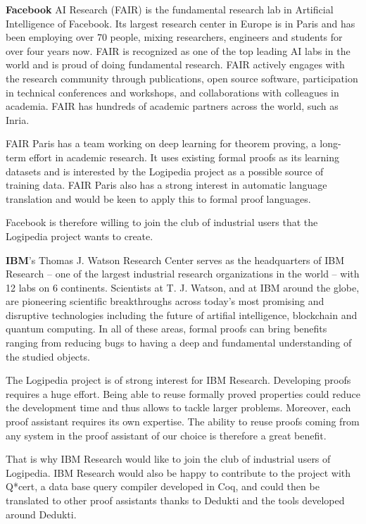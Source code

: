 {{\bf Facebook} AI Research (FAIR) is the fundamental research lab in
Artificial Intelligence of Facebook. Its largest research center in
Europe is in Paris and has been employing over 70 people, mixing
researchers, engineers and students for over four years now. FAIR is
recognized as one of the top leading AI labs in the world and is proud
of doing fundamental research. FAIR actively engages with the research
community through publications, open source software, participation in
technical conferences and workshops, and collaborations with
colleagues in academia. FAIR has hundreds of academic partners across
the world, such as Inria.

FAIR Paris has a team working on deep learning for theorem proving, a
long-term effort in academic research. It uses existing formal proofs
as its learning datasets and is interested by the Logipedia project as
a possible source of training data. FAIR Paris also has a strong
interest in automatic language translation and would be keen to apply
this to formal proof languages.

Facebook is therefore willing to join the club of industrial users
that the Logipedia project wants to create.

{\bf IBM}'s Thomas J. Watson Research Center serves as the
headquarters of IBM Research -- one of the largest industrial research
organizations in the world -- with 12 labs on 6 continents. Scientists
at T. J. Watson, and at IBM around the globe, are pioneering
scientific breakthroughs across today's most promising and disruptive
technologies including the future of artifial intelligence, blockchain
and quantum computing. In all of these areas, formal proofs can bring
benefits ranging from reducing bugs to having a deep and fundamental
understanding of the studied objects.

The Logipedia project is of strong interest for IBM
Research. Developing proofs requires a huge effort. Being able to
reuse formally proved properties could reduce the development time and
thus allows to tackle larger problems. Moreover, each proof assistant
requires its own expertise. The ability to reuse proofs coming from
any system in the proof assistant of our choice is therefore a great
benefit.

That is why IBM Research would like to join the club of industrial
users of Logipedia. IBM Research would also be happy to contribute to
the project with Q*cert, a data base query compiler developed in Coq,
and could then be translated to other proof assistants thanks to
Dedukti and the tools developed around Dedukti.

}
